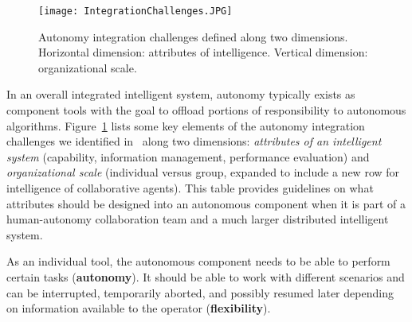 

\begin{figure}
\centering
\texttt{[image: IntegrationChallenges.JPG]}
\caption{Autonomy integration challenges defined along two dimensions. Horizontal dimension: attributes of intelligence. Vertical dimension: organizational scale.}
\label{challenges}
\end{figure}

In an overall integrated intelligent system, autonomy typically exists as component tools with the goal to offload portions of responsibility to autonomous algorithms. Figure~\ref{challenges} lists some key elements of the autonomy integration challenges we identified in~\cite{Lin2010Supporting} along two dimensions: \textit{attributes of an intelligent system} (capability, information management, performance evaluation) and \textit{organizational scale} (individual versus group, expanded to include a new row for intelligence of collaborative agents). This table provides guidelines on what attributes should be designed into an autonomous component when it is part of a human-autonomy collaboration team and a much larger distributed intelligent system. 

As an individual tool, the autonomous component needs to be able to perform certain tasks (\textbf{autonomy}). It should be able to work with different scenarios and can be interrupted, temporarily aborted, and possibly resumed later depending on information available to the operator (\textbf{flexibility}). 


